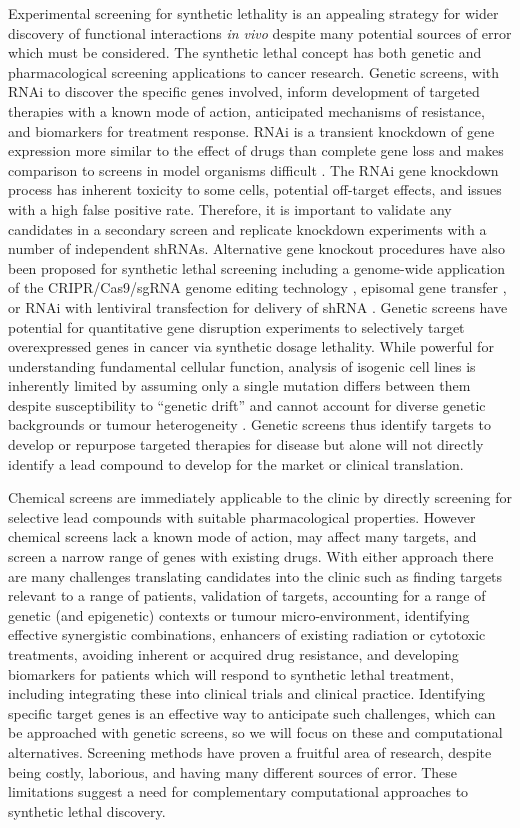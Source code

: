 Experimental screening for synthetic lethality is an appealing strategy for wider discovery of functional interactions \textit{in vivo} despite many potential sources of error which must be considered. The synthetic lethal concept has both genetic and pharmacological screening applications to cancer research. Genetic screens, with RNAi to discover the specific genes involved, inform development of targeted therapies with a known mode of action, anticipated mechanisms of resistance, and biomarkers for treatment response. RNAi is a transient knockdown of gene expression more similar to the effect of drugs than complete gene loss and makes comparison to screens in model organisms difficult \citep{Bussey2006}. The RNAi gene knockdown process has inherent toxicity to some cells, potential off-target effects, and issues with a high false positive rate. Therefore, it is important to validate any candidates in a secondary screen and replicate knockdown experiments with a number of independent shRNAs. Alternative gene knockout procedures have also been proposed for synthetic lethal screening including a genome-wide application of the CRIPR/Cas9/sgRNA genome editing technology \citep{Sander2014}, episomal gene transfer \citep{Vargas2004}, or RNAi with lentiviral transfection for delivery of shRNA \citep{Telford2015}. Genetic screens have potential for quantitative gene disruption experiments to selectively target overexpressed genes in cancer via synthetic dosage lethality. While powerful for understanding fundamental cellular function, analysis of isogenic cell lines is inherently limited by assuming only a single mutation differs between them despite susceptibility to ``genetic drift'' and cannot account for diverse genetic backgrounds or tumour heterogeneity \citep{Fece2015}. Genetic screens thus identify targets to develop or repurpose targeted therapies for disease but alone will not directly identify a lead compound to develop for the market or clinical translation.  

Chemical screens are immediately applicable to the clinic by directly screening for selective lead compounds with suitable pharmacological properties. However chemical screens lack a known mode of action, may affect many targets, and screen a narrow range of genes with existing drugs. With either approach there are many challenges translating candidates into the clinic such as finding targets relevant to a range of patients, validation of targets, accounting for a range of genetic (and epigenetic) contexts or tumour micro-environment, identifying effective synergistic combinations, enhancers of existing radiation or cytotoxic treatments, avoiding inherent or acquired drug resistance, and developing biomarkers for patients which will respond to synthetic lethal treatment, including integrating these into clinical trials and clinical practice. Identifying specific target genes is an effective way to anticipate such challenges, which can be approached with genetic screens, so we will focus on these and computational alternatives. Screening methods have proven a fruitful area of research, despite being costly, laborious, and having many different sources of error. These limitations suggest a need for complementary computational approaches to synthetic lethal discovery.  

